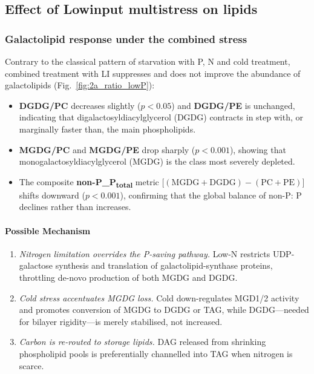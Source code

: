 \documentclass[10pt,letterpaper]{article}
\begin{document}
\subsection*{Effect of Lowinput multistress on lipids}

\subsubsection*{Galactolipid response under the combined stress}

Contrary to the classical pattern of starvation with P, N and cold treatment, combined treatment with LI suppresses and does not improve the abundance of galactolipids (Fig.~\ref{fig:2a_ratio_lowP}):

\begin{itemize}
  \item \textbf{DGDG/PC} decreases slightly ($p<0.05$) and
        \textbf{DGDG/PE} is unchanged, indicating that digalactosyldiacylglycerol (DGDG) contracts in step with, or marginally faster than, the main phospholipids.
  \item \textbf{MGDG/PC} and \textbf{MGDG/PE} drop sharply
        ($p<0.001$), showing that
        monogalactosyldiacylglycerol (MGDG) is the class most severely depleted.
  \item The composite \textbf{ non-P_P\textsubscript{total}} metric
        \(\bigl[(\mathrm{MGDG}+\mathrm{DGDG})-(\mathrm{PC}+\mathrm{PE})\bigr]\)
        shifts downward ($p<0.001$), confirming that the global
balance of non-P: P declines rather than increases.
\end{itemize}

\paragraph{Possible Mechanism}
\begin{enumerate}
  \item \textit{Nitrogen limitation overrides the P-saving pathway.}  
        Low-N restricts UDP-galactose synthesis and translation of
        galactolipid-synthase proteins, throttling de-novo production of both
        MGDG and DGDG.
  \item \textit{Cold stress accentuates MGDG loss.}  
        Cold down-regulates MGD1/2 activity and promotes conversion of MGDG to
        DGDG or TAG, while DGDG—needed for bilayer rigidity—is merely
        stabilised, not increased.
  \item \textit{Carbon is re-routed to storage lipids.}  
        DAG released from shrinking phospholipid pools is preferentially
        channelled into TAG when nitrogen is scarce.
\end{enumerate}
\end{document}
